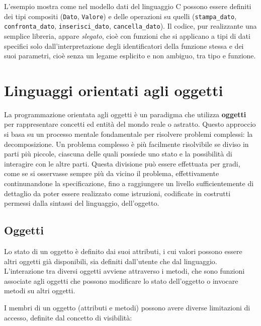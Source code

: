 \documentclass[
  letterpaper,
]{scrbook}
\begin{document}
L'esempio mostra come nel modello dati del linguaggio C possono essere
definiti dei tipi compositi (\texttt{Dato}, \texttt{Valore}) e delle
operazioni su quelli (\texttt{stampa\_dato}, \texttt{confronta\_dato},
\texttt{inserisci\_dato}, \texttt{cancella\_dato}). Il codice, pur
realizzante una semplice libreria, appare \emph{slegato}, cioè con
funzioni che si applicano a tipi di dati specifici solo
dall'interpretazione degli identificatori della funzione stessa e dei
suoi parametri, cioè senza un legame esplicito e non ambiguo, tra tipo e
funzione.

\section{Linguaggi orientati agli
oggetti}\label{linguaggi-orientati-agli-oggetti}

La programmazione orientata agli oggetti è un paradigma che utilizza
\textbf{oggetti} per rappresentare concetti ed entità del mondo reale o
astratto. Questo approccio si basa su un processo mentale fondamentale
per risolvere problemi complessi: la decomposizione. Un problema
complesso è più facilmente risolvibile se diviso in parti più piccole,
ciascuna delle quali possiede uno stato e la possibilità di interagire
con le altre parti. Questa divisione può essere effettuata per gradi,
come se si osservasse sempre più da vicino il problema, effettivamente
continunandone la specificazione, fino a raggiungere un livello
sufficientemente di dettaglio da poter essere realizzato come
istruzioni, codificate in costrutti permessi dalla sintassi del
linguaggio, dell'oggetto.

\subsection{Oggetti}\label{oggetti}

Lo stato di un oggetto è definito dai suoi attributi, i cui valori
possono essere altri oggetti già disponibili, sia definiti dall'utente
che dal linguaggio. L'interazione tra diversi oggetti avviene attraverso
i metodi, che sono funzioni associate agli oggetti che possono
modificare lo stato dell'oggetto o invocare metodi su altri oggetti.

I membri di un oggetto (attributi e metodi) possono avere diverse
limitazioni di accesso, definite dal concetto di visibilità:
\end{document}
